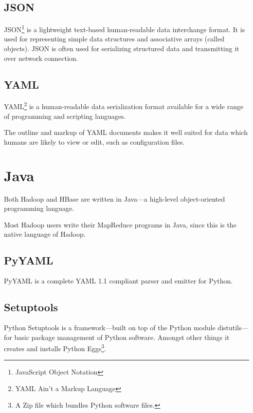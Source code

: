 \documentclass[a4paper,10pt]{book}
\begin{document}
\subsection{JSON}

JSON\footnote{JavaScript Object Notation} is a lightweight text-based
human-readable data interchange format. It is used for representing simple
data structures and associative arrays (called objects). JSON is often used
for serializing structured data and transmitting it over network
connection.


\subsection{YAML}

YAML\footnote{YAML Ain't a Markup Language} is a human-readable data
serialization format available for a wide range of programming and
scripting languages.

The outline and markup of YAML documents makes it well suited for data
which humans are likely to view or edit, such as configuration files.



\section{Java}

Both Hadoop and HBase are written in Java---a high-level object-oriented
programming language.

Most Hadoop users write their MapReduce programs in Java, since this is the
native language of Hadoop. \cite{java}




\subsection{PyYAML}

PyYAML is a complete YAML 1.1 compliant parser and emitter for Python.
\cite{pyyaml}


\subsection{Setuptools}

Python Setuptools is a framework---built on top of the Python module
distutils---for basic package management of Python software. Amongst other
things it creates and installs Python Eggs\footnote{A Zip file which
bundles Python software files.}. \cite{setuptools}
\end{document}
